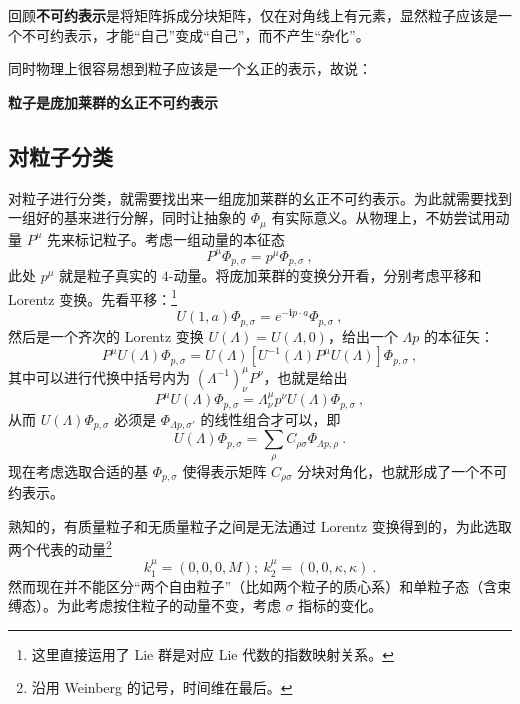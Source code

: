 回顾\textbf{\textbf{不可约表示}}是将矩阵拆成分块矩阵，仅在对角线上有元素，显然粒子应该是一个不可约表示，才能“自己”变成“自己”，而不产生“杂化”。

同时物理上很容易想到粒子应该是一个幺正的表示，故说：

\textbf{\textbf{粒子是庞加莱群的幺正不可约表示}}



\subsection{对粒子分类}
对粒子进行分类，就需要找出来一组庞加莱群的幺正不可约表示。为此就需要找到一组好的基来进行分解，同时让抽象的 $\Phi_\mu$ 有实际意义。从物理上，不妨尝试用动量 $P^\mu$ 先来标记粒子。考虑一组动量的本征态 
\begin{equation}
	P^\mu \Phi_{p, \sigma} = p^\mu \Phi_{p, \sigma} ~,
\end{equation}
此处 $p^\mu$ 就是粒子真实的 $4$-动量。将庞加莱群的变换分开看，分别考虑平移和 Lorentz 变换。先看平移：\footnote{这里直接运用了 Lie 群是对应 Lie 代数的指数映射关系。}
\begin{equation}
	U(1, a) \Phi_{p, \sigma} = e^{-\mathbf{i} p \cdot a} \Phi_{p, \sigma} ~,
\end{equation}
然后是一个齐次的 Lorentz 变换 $U(\Lambda) = U(\Lambda, 0)$，给出一个 $\Lambda p$ 的本征矢：
\begin{equation}
	P^\mu U(\Lambda) \Phi_{p, \sigma} = U(\Lambda) [U^{-1}(\Lambda) P^\mu U(\Lambda)] \Phi_{p, \sigma} ~, 
\end{equation}
其中可以进行代换中括号内为 $(\Lambda^{-1})^\mu_{\nu} P^\nu$，也就是给出 
\begin{equation}
	P^\mu U(\Lambda) \Phi_{p, \sigma} = \Lambda_\nu^\mu p^\nu U(\Lambda) \Phi_{p, \sigma} ~,
\end{equation}
从而 $U(\Lambda) \Phi_{p, \sigma}$ 必须是 $\Phi_{\Lambda p, \sigma'}$ 的线性组合才可以，即 
\begin{equation}
	U(\Lambda) \Phi_{p, \sigma} = \sum_{\rho} C_{\rho \sigma} \Phi_{\Lambda p, \rho} ~.
\end{equation}
现在考虑选取合适的基 $\Phi_{p, \sigma}$ 使得表示矩阵 $C_{\rho \sigma}$ 分块对角化，也就形成了一个不可约表示。

熟知的，有质量粒子和无质量粒子之间是无法通过 Lorentz 变换得到的，为此选取两个代表的动量\footnote{沿用 Weinberg 的记号，时间维在最后。}
\begin{equation}
	k_1^\mu = (0, 0, 0, M); ~ k_2^\mu = (0, 0, \kappa, \kappa) ~.
\end{equation}
然而现在并不能区分“两个自由粒子”（比如两个粒子的质心系）和单粒子态（含束缚态）。为此考虑按住粒子的动量不变，考虑 $\sigma$ 指标的变化。

